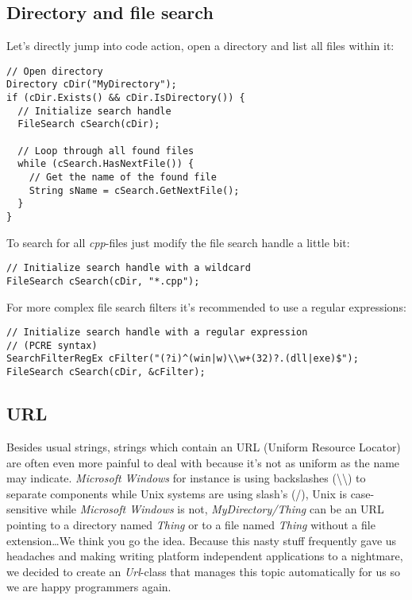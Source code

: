 \subsection{Directory and file search}
Let's directly jump into code action, open a directory and list all files within it:

\begin{lstlisting}[caption=Directory and file search usage example]
// Open directory
Directory cDir("MyDirectory");
if (cDir.Exists() && cDir.IsDirectory()) {
  // Initialize search handle
  FileSearch cSearch(cDir);

  // Loop through all found files
  while (cSearch.HasNextFile()) {
    // Get the name of the found file
    String sName = cSearch.GetNextFile();
  }
}
\end{lstlisting}

To search for all \emph{cpp}-files just modify the file search handle a little bit:

\begin{lstlisting}[caption=Wildcard search handle]
// Initialize search handle with a wildcard
FileSearch cSearch(cDir, "*.cpp");
\end{lstlisting}

For more complex file search filters it's recommended to use a regular expressions:

\begin{lstlisting}[caption=Regular expression search handle]
// Initialize search handle with a regular expression
// (PCRE syntax)
SearchFilterRegEx cFilter("(?i)^(win|w)\\w+(32)?.(dll|exe)$");
FileSearch cSearch(cDir, &cFilter);
\end{lstlisting}




\subsection{URL}
Besides usual strings, strings which contain an URL (Uniform Resource Locator) are often even more painful to deal with because it's not as uniform as the name may indicate. \emph{Microsoft Windows} for instance is using backslashes (\textbackslash\textbackslash) to separate components while Unix systems are using slash's (/), Unix is case-sensitive while \emph{Microsoft Windows} is not, \emph{MyDirectory/Thing} can be an URL pointing to a directory named \emph{Thing} or to a file named \emph{Thing} without a file extension\ldots We think you go the idea. Because this nasty stuff frequently gave us headaches and making writing platform independent applications to a nightmare, we decided to create an \emph{Url}-class that manages this topic automatically for us so we are happy programmers again.

